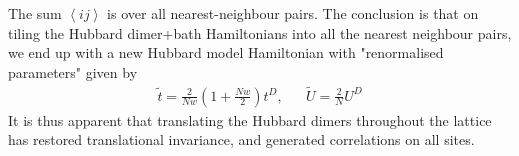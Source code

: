 \documentclass{article}
\numberwithin{equation}{section}
\begin{document}
The sum $\left<ij\right>$ is over all nearest-neighbour pairs. 
The conclusion is that on tiling the Hubbard dimer+bath Hamiltonians into all the nearest neighbour pairs, we end up with a new Hubbard model Hamiltonian with "renormalised parameters" given by
\begin{equation}\begin{aligned}
	\tilde t = \frac{2}{Nw}(1 + \frac{Nw}{2})t^D, &&\tilde U = \frac{2}{N}U^D
\end{aligned}\end{equation}
It is thus apparent that translating the Hubbard dimers throughout the lattice has restored translational invariance, and generated correlations on all sites. 
\end{document}
